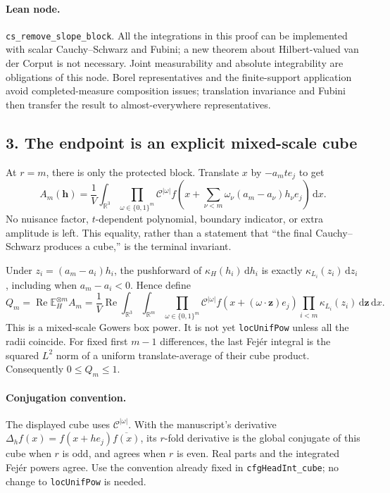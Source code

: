 \documentclass[11pt]{article}
\newcommand{\R}{\mathbb R}
\newcommand{\E}{\mathbb E}
\newcommand{\CC}{\mathcal C}
\newcommand{\dd}{\,\mathrm d}
\newcommand{\idname}[1]{\nolinkurl{#1}}
\theoremstyle{definition}\newtheorem{definition}[lemma]{Definition}
\begin{document}
\paragraph{Lean node.}
\idname{cs_remove_slope_block}. All the integrations in this proof can be implemented with scalar Cauchy--Schwarz and Fubini; a new theorem about Hilbert-valued van der Corput is not necessary. Joint measurability and absolute integrability are obligations of this node. Borel representatives and the finite-support application avoid completed-measure composition issues; translation invariance and Fubini then transfer the result to almost-everywhere representatives.

\subsection*{3. The endpoint is an explicit mixed-scale cube}
At $r=m$, there is only the protected block. Translate $x$ by $-a_mt e_j$ to get
\begin{equation}\label{eq:terminal}
 A_m(\mathbf h)=\frac1V\int_{\R^3}
    \prod_{\omega\in\{0,1\}^m}\CC^{|\omega|}
       f\!\left(x+\sum_{\nu<m}\omega_\nu
                     (a_m-a_\nu)h_\nu e_j\right)\dd x.
\end{equation}
No nuisance factor, $t$-dependent polynomial, boundary indicator, or extra amplitude is left. This equality, rather than a statement that ``the final Cauchy--Schwarz produces a cube,'' is the terminal invariant.

Under $z_i=(a_m-a_i)h_i$, the pushforward of $\kappa_H(h_i)\dd h_i$ is exactly $\kappa_{L_i}(z_i)\dd z_i$, including when $a_m-a_i<0$. Hence define
\begin{equation}\label{eq:box}
 Q_m=\operatorname{Re}\E_H^{\otimes m}A_m
 =\frac1V\operatorname{Re}\int_{\R^3}\int_{\R^m}
      \prod_{\omega\in\{0,1\}^m}\CC^{|\omega|}
        f(x+(\omega\cdot\mathbf z)e_j)
      \prod_{i<m}\kappa_{L_i}(z_i)\dd\mathbf z\dd x.
\end{equation}
This is a mixed-scale Gowers box power. It is not yet \idname{locUnifPow} unless all the radii coincide. For fixed first $m-1$ differences, the last Fej\'er integral is the squared $L^2$ norm of a uniform translate-average of their cube product. Consequently $0\leq Q_m\leq1$.

\paragraph{Conjugation convention.}
The displayed cube uses $\CC^{|\omega|}$. With the manuscript's derivative $\Delta_hf(x)=f(x+he_j)\overline{f(x)}$, its $r$-fold derivative is the global conjugate of this cube when $r$ is odd, and agrees when $r$ is even. Real parts and the integrated Fej\'er powers agree. Use the convention already fixed in \idname{cfgHeadInt_cube}; no change to \idname{locUnifPow} is needed.
\end{document}
